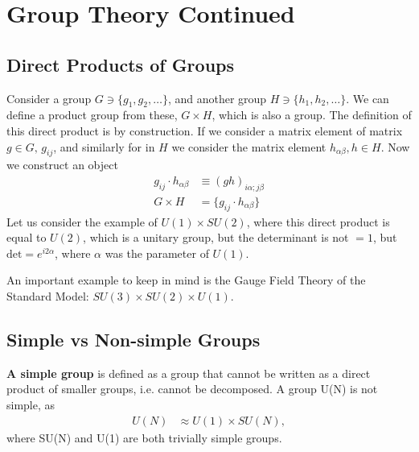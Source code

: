 \documentclass[a4paper, 11pt, normalem]{report}
\begin{document}
\section{Group Theory Continued}
\subsection{Direct Products of Groups}
Consider a group $G \ni \{g_1,g_2,\dots\}$, and another group $H \ni \{h_1,h_2,\dots\}$.
We can define a product group from these, $G\times H$, which is also a group.
The definition of this direct product is by construction.
If we consider a matrix element of matrix $g \in G,\, g_{ij}$, and similarly for in $H$ we consider the matrix element $h_{\alpha\beta}, h \in H$.
Now we construct an object
\begin{align}
    g_{ij}\cdot h_{\alpha\beta} &\equiv (gh)_{i\alpha;j\beta} \\
    G\times H &= \{g_{ij}\cdot h_{\alpha\beta}\}
\end{align}
Let us consider the example of $U(1)\times SU(2)$, where this direct product is equal to $U(2)$, which is a unitary group, but the determinant is not $=1$, but $\text{det}=e^{i2\alpha}$, where $\alpha$ was the parameter of $U(1)$.

An important example to keep in mind is the Gauge Field Theory of the Standard Model: $SU(3)\times SU(2)\times U(1)$.

\subsection{Simple vs Non-simple Groups}
\textbf{A simple group} is defined as a group that cannot be written as a direct product of smaller groups, i.e. cannot be decomposed.
A group U(N) is not simple, as
\begin{align}
    U(N) &\approx U(1)\times SU(N),
\end{align}
where SU(N) and U(1) are both trivially simple groups.
\end{document}
